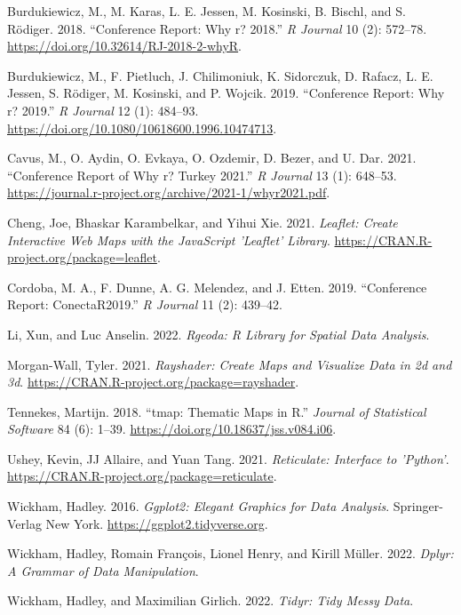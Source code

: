 \hypertarget{refs}{}
\begin{CSLReferences}{1}{0}
\leavevmode{}%
Burdukiewicz, M., M. Karas, L. E. Jessen, M. Kosinski, B. Bischl, and S. Rödiger. 2018. {``Conference Report: Why r? 2018.''} \emph{R Journal} 10 (2): 572--78. \url{https://doi.org/10.32614/RJ-2018-2-whyR}.

\leavevmode{}%
Burdukiewicz, M., F. Pietluch, J. Chilimoniuk, K. Sidorczuk, D. Rafacz, L. E. Jessen, S. Rödiger, M. Kosinski, and P. Wojcik. 2019. {``Conference Report: Why r? 2019.''} \emph{R Journal} 12 (1): 484--93. \url{https://doi.org/10.1080/10618600.1996.10474713}.

\leavevmode{}%
Cavus, M., O. Aydin, O. Evkaya, O. Ozdemir, D. Bezer, and U. Dar. 2021. {``Conference Report of Why r? Turkey 2021.''} \emph{R Journal} 13 (1): 648--53. \url{https://journal.r-project.org/archive/2021-1/whyr2021.pdf}.

\leavevmode{}%
Cheng, Joe, Bhaskar Karambelkar, and Yihui Xie. 2021. \emph{Leaflet: Create Interactive Web Maps with the JavaScript 'Leaflet' Library}. \url{https://CRAN.R-project.org/package=leaflet}.

\leavevmode{}%
Cordoba, M. A., F. Dunne, A. G. Melendez, and J. Etten. 2019. {``Conference Report: ConectaR2019.''} \emph{R Journal} 11 (2): 439--42.

\leavevmode{}%
Li, Xun, and Luc Anselin. 2022. \emph{Rgeoda: R Library for Spatial Data Analysis}.

\leavevmode{}%
Morgan-Wall, Tyler. 2021. \emph{Rayshader: Create Maps and Visualize Data in 2d and 3d}. \url{https://CRAN.R-project.org/package=rayshader}.

\leavevmode{}%
Tennekes, Martijn. 2018. {``{tmap}: Thematic Maps in {R}.''} \emph{Journal of Statistical Software} 84 (6): 1--39. \url{https://doi.org/10.18637/jss.v084.i06}.

\leavevmode{}%
Ushey, Kevin, JJ Allaire, and Yuan Tang. 2021. \emph{Reticulate: Interface to 'Python'}. \url{https://CRAN.R-project.org/package=reticulate}.

\leavevmode{}%
Wickham, Hadley. 2016. \emph{Ggplot2: Elegant Graphics for Data Analysis}. Springer-Verlag New York. \url{https://ggplot2.tidyverse.org}.

\leavevmode{}%
Wickham, Hadley, Romain François, Lionel Henry, and Kirill Müller. 2022. \emph{Dplyr: A Grammar of Data Manipulation}.

\leavevmode{}%
Wickham, Hadley, and Maximilian Girlich. 2022. \emph{Tidyr: Tidy Messy Data}.

\end{CSLReferences}

